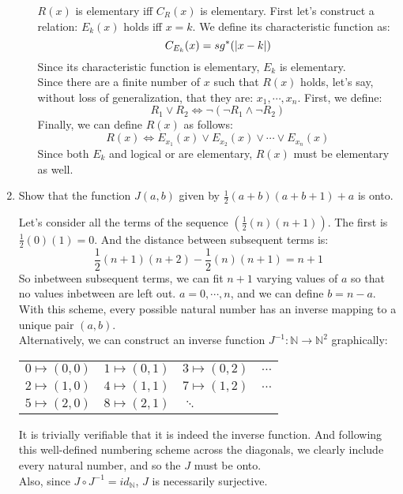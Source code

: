 \begin{enumerate}
\begin{enumerate}
        $R(x)$ is elementary iff $C_R(x)$ is elementary. First let's construct a relation: $E_k(x)$ holds iff $x=k$. We define its characteristic function as:
        $$C_{E_k}(x) = sg^*(\left\vert x-k \right\vert)$$
        Since its characteristic function is elementary, $E_k$ is elementary.\\
        Since there are a finite number of $x$ such that $R(x)$ holds, let's say, without loss of generalization, that they are: $x_1, \cdots, x_n$. First, we define:
        $$R_1 \lor R_2 \iff \neg(\neg R_1 \land \neg R_2)$$
        Finally, we can define $R(x)$ as follows:
        $$R(x) \iff E_{x_1}(x) \lor E_{x_2}(x) \lor \cdots \lor E_{x_n}(x)$$
        Since both $E_k$ and logical or are elementary, $R(x)$ must be elementary as well.
        
    \end{enumerate}
  \item 
    \begin{question}
      Show that the function $J(a,b)$ given by $\frac{1}{2}(a+b)(a+b+1) + a$ is onto.
    \end{question}

    Let's consider all the terms of the sequence $(\frac{1}{2}(n)(n+1))$. The first is $\frac{1}{2}(0)(1) = 0$. And the distance between subsequent terms is:
    $$\frac{1}{2}(n+1)(n+2) - \frac{1}{2}(n)(n+1) = n + 1$$
    So inbetween subsequent terms, we can fit $n+1$ varying values of $a$ so that no values inbetween are left out. $a = 0, \cdots, n$, and we can define $b = n-a$. With this scheme, every possible natural number has an inverse mapping to a unique pair $(a,b)$.\\

    Alternatively, we can construct an inverse function $J^{-1} : \mathds{N} \rightarrow \mathds{N}^2$ graphically:\\
    \begin{tabular}{ l l l l }
      $0 \mapsto (0, 0)$ & $1 \mapsto (0, 1)$ & $3 \mapsto (0, 2)$ & $\dots$ \\
      $2 \mapsto (1, 0)$ & $4 \mapsto (1, 1)$ & $7 \mapsto (1,2)$ & $\dots$ \\
      $5 \mapsto (2, 0)$ & $8 \mapsto (2, 1)$ & $\ddots$ \\
    \end{tabular}

    It is trivially verifiable that it is indeed the inverse function. And following this well-defined numbering scheme across the diagonals, we clearly include every natural number, and so the $J$ must be onto. \\

    Also, since $J \circ J^{-1} = id_{\mathds{N}}$, $J$ is necessarily surjective.

    
\end{enumerate}

